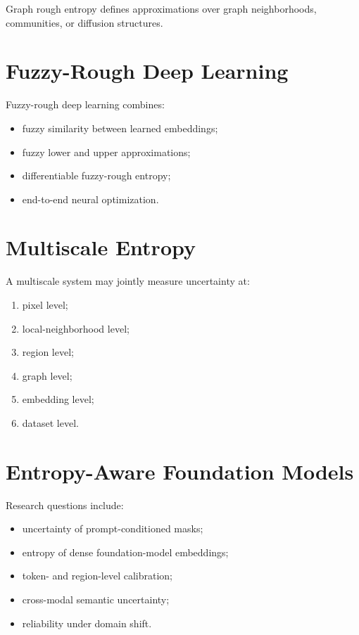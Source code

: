 \documentclass[11pt,oneside]{book}
\theoremstyle{remark}
\begin{document}
	Graph rough entropy defines approximations over graph neighborhoods,
	communities, or diffusion structures.
	
	\section{Fuzzy-Rough Deep Learning}
	
	Fuzzy-rough deep learning combines:
	
	\begin{itemize}
		\item fuzzy similarity between learned embeddings;
		\item fuzzy lower and upper approximations;
		\item differentiable fuzzy-rough entropy;
		\item end-to-end neural optimization.
	\end{itemize}
	
	\section{Multiscale Entropy}
	
	A multiscale system may jointly measure uncertainty at:
	
	\begin{enumerate}
		\item pixel level;
		\item local-neighborhood level;
		\item region level;
		\item graph level;
		\item embedding level;
		\item dataset level.
	\end{enumerate}
	
	\section{Entropy-Aware Foundation Models}
	
	Research questions include:
	
	\begin{itemize}
		\item uncertainty of prompt-conditioned masks;
		\item entropy of dense foundation-model embeddings;
		\item token- and region-level calibration;
		\item cross-modal semantic uncertainty;
		\item reliability under domain shift.
	\end{itemize}
	
\end{document}
